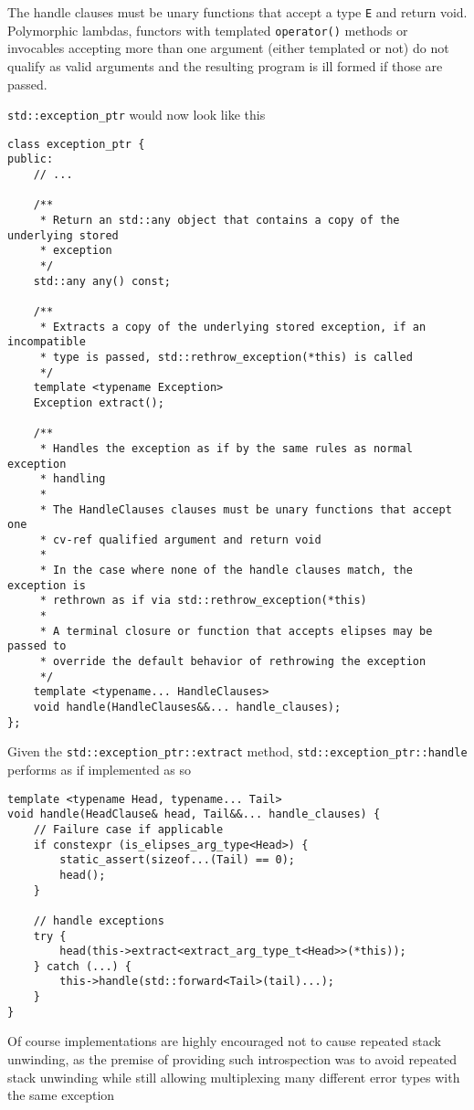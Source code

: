 \documentclass{article}
\begin{document}
The handle clauses must be unary functions that accept a type \texttt{E} and
return void.  Polymorphic lambdas, functors with templated \texttt{operator()}
methods or invocables accepting more than one argument (either templated or
not) do not qualify as valid arguments and the resulting program is ill formed
if those are passed.

\texttt{std::exception\_ptr} would now look like this
\begin{lstlisting}
class exception_ptr {
public:
    // ...

    /**
     * Return an std::any object that contains a copy of the underlying stored
     * exception
     */
    std::any any() const;

    /**
     * Extracts a copy of the underlying stored exception, if an incompatible
     * type is passed, std::rethrow_exception(*this) is called
     */
    template <typename Exception>
    Exception extract();

    /**
     * Handles the exception as if by the same rules as normal exception
     * handling
     *
     * The HandleClauses clauses must be unary functions that accept one
     * cv-ref qualified argument and return void
     *
     * In the case where none of the handle clauses match, the exception is
     * rethrown as if via std::rethrow_exception(*this)
     *
     * A terminal closure or function that accepts elipses may be passed to
     * override the default behavior of rethrowing the exception
     */
    template <typename... HandleClauses>
    void handle(HandleClauses&&... handle_clauses);
};
\end{lstlisting}

Given the \texttt{std::exception\_ptr::extract} method,
\texttt{std::exception\_ptr::handle} performs as if implemented as so
\begin{lstlisting}
template <typename Head, typename... Tail>
void handle(HeadClause& head, Tail&&... handle_clauses) {
    // Failure case if applicable
    if constexpr (is_elipses_arg_type<Head>) {
        static_assert(sizeof...(Tail) == 0);
        head();
    }

    // handle exceptions
    try {
        head(this->extract<extract_arg_type_t<Head>>(*this));
    } catch (...) {
        this->handle(std::forward<Tail>(tail)...);
    }
}
\end{lstlisting}

Of course implementations are highly encouraged not to cause repeated stack
unwinding, as the premise of providing such introspection was to avoid
repeated stack unwinding while still allowing multiplexing many different
error types with the same exception
\end{document}
